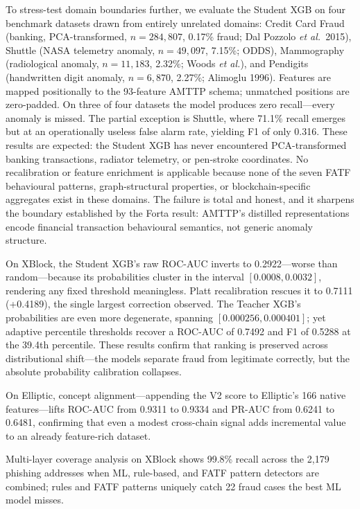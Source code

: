 \documentclass[journal]{IEEEtran}
\newcommand{\etal}{\textit{et al.}}
\begin{document}
To stress-test domain boundaries further, we evaluate the Student XGB on four benchmark datasets drawn from entirely unrelated domains: Credit Card Fraud (banking, PCA-transformed, $n = 284{,}807$, 0.17\% fraud; Dal Pozzolo \etal\ 2015), Shuttle (NASA telemetry anomaly, $n = 49{,}097$, 7.15\%; ODDS), Mammography (radiological anomaly, $n = 11{,}183$, 2.32\%; Woods \etal), and Pendigits (handwritten digit anomaly, $n = 6{,}870$, 2.27\%; Alimoglu 1996). Features are mapped positionally to the 93-feature AMTTP schema; unmatched positions are zero-padded. On three of four datasets the model produces zero recall---every anomaly is missed. The partial exception is Shuttle, where 71.1\% recall emerges but at an operationally useless false alarm rate, yielding F1 of only 0.316. These results are expected: the Student XGB has never encountered PCA-transformed banking transactions, radiator telemetry, or pen-stroke coordinates. No recalibration or feature enrichment is applicable because none of the seven FATF behavioural patterns, graph-structural properties, or blockchain-specific aggregates exist in these domains. The failure is total and honest, and it sharpens the boundary established by the Forta result: AMTTP's distilled representations encode financial transaction behavioural semantics, not generic anomaly structure.

On XBlock, the Student XGB's raw ROC-AUC inverts to 0.2922---worse than random---because its probabilities cluster in the interval $[0.0008, 0.0032]$, rendering any fixed threshold meaningless. Platt recalibration rescues it to 0.7111 (+0.4189), the single largest correction observed. The Teacher XGB's probabilities are even more degenerate, spanning $[0.000256, 0.000401]$; yet adaptive percentile thresholds recover a ROC-AUC of 0.7492 and F1 of 0.5288 at the 39.4th percentile. These results confirm that ranking is preserved across distributional shift---the models separate fraud from legitimate correctly, but the absolute probability calibration collapses.

On Elliptic, concept alignment---appending the V2 score to Elliptic's 166 native features---lifts ROC-AUC from 0.9311 to 0.9334 and PR-AUC from 0.6241 to 0.6481, confirming that even a modest cross-chain signal adds incremental value to an already feature-rich dataset.

Multi-layer coverage analysis on XBlock shows 99.8\% recall across the 2,179 phishing addresses when ML, rule-based, and FATF pattern detectors are combined; rules and FATF patterns uniquely catch 22 fraud cases the best ML model misses.
\end{document}

